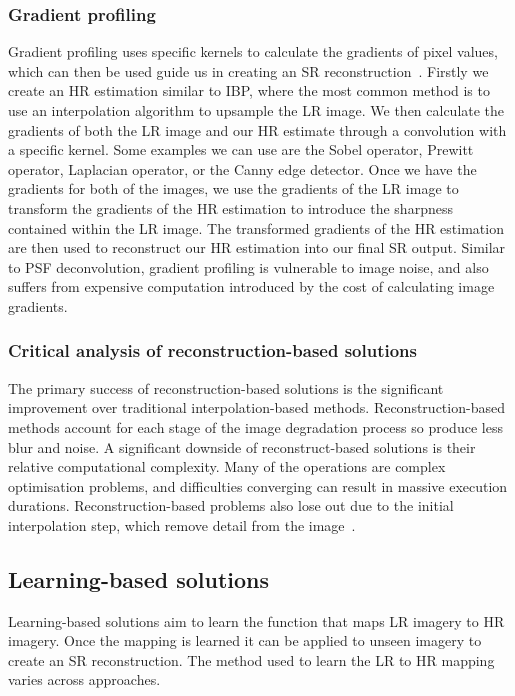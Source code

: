 \subsubsection{Gradient profiling}
Gradient profiling uses specific kernels to calculate the gradients of pixel values, which can then be used guide us in creating an SR reconstruction~\cite{ref}. Firstly we create an HR estimation similar to IBP, where the most common method is to use an interpolation algorithm to upsample the LR image. We then calculate the gradients of both the LR image and our HR estimate through a convolution with a specific kernel. Some examples we can use are the Sobel operator, Prewitt operator, Laplacian operator, or the Canny edge detector. Once we have the gradients for both of the images, we use the gradients of the LR image to transform the gradients of the HR estimation to introduce the sharpness contained within the LR image. The transformed gradients of the HR estimation are then used to reconstruct our HR estimation into our final SR output. Similar to PSF deconvolution, gradient profiling is vulnerable to image noise, and also suffers from expensive computation introduced by the cost of calculating image gradients.

\subsubsection{Critical analysis of reconstruction-based solutions}
The primary success of reconstruction-based solutions is the significant improvement over traditional interpolation-based methods. Reconstruction-based methods account for each stage of the image degradation process so produce less blur and noise. A significant downside of reconstruct-based solutions is their relative computational complexity. Many of the operations are complex optimisation problems, and difficulties converging can result in massive execution durations. Reconstruction-based problems also lose out due to the initial interpolation step, which remove detail from the image~\cite{remoteSensingGANsReview}.

\subsection{Learning-based solutions}
Learning-based solutions aim to learn the function that maps LR imagery to HR imagery. Once the mapping is learned it can be applied to unseen imagery to create an SR reconstruction. The method used to learn the LR to HR mapping varies across approaches.

